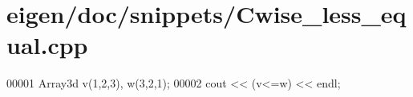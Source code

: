 \hypertarget{eigen_2doc_2snippets_2_cwise__less__equal_8cpp_source}{}\section{eigen/doc/snippets/\+Cwise\+\_\+less\+\_\+equal.cpp}
\label{eigen_2doc_2snippets_2_cwise__less__equal_8cpp_source}

\begin{DoxyCode}
00001 Array3d v(1,2,3), w(3,2,1);
00002 cout << (v<=w) << endl;
\end{DoxyCode}
